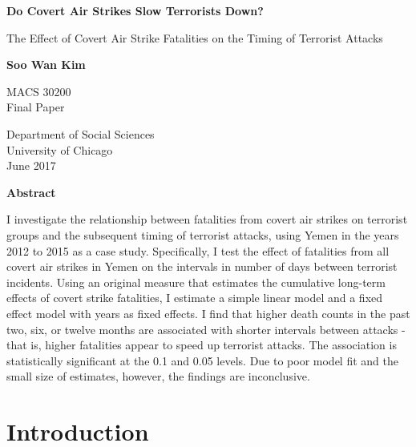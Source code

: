 \documentclass[letterpaper,12pt]{article}
\theoremstyle{definition}
\begin{document}
\begin{titlepage}
    \begin{center}
        \vspace*{1cm}
        
        \Large
        \textbf{Do Covert Air Strikes Slow Terrorists Down?}
        
        \vspace{0.5cm}
        \Large
        The Effect of Covert Air Strike Fatalities on the Timing of Terrorist Attacks
        
        \vspace{0.5cm}
        
        \textbf{Soo Wan Kim}
        
        
        MACS 30200\\
        Final Paper
        
        \vspace{0.8cm}
        
        \Large
        Department of Social Sciences\\
        University of Chicago\\
        June 2017
        
    \end{center}
\end{titlepage}

\singlespacing

\begin{center}
    \Large
    \textbf{Abstract}
\end{center}
I investigate the relationship between fatalities from covert air strikes on terrorist groups and the subsequent timing of terrorist attacks, using Yemen in the years 2012 to 2015 as a case study. Specifically, I test the effect of fatalities from all covert air strikes in Yemen on the intervals in number of days between terrorist incidents. Using an original measure that estimates the cumulative long-term effects of covert strike fatalities, I estimate a simple linear model and a fixed effect model with years as fixed effects. I find that higher death counts in the past two, six, or twelve months are associated with shorter intervals between attacks - that is, higher fatalities appear to speed up terrorist attacks. The association is statistically significant at the 0.1 and 0.05 levels. Due to poor model fit and the small size of estimates, however, the findings are inconclusive.

\doublespacing

\section{Introduction}
\end{document}
